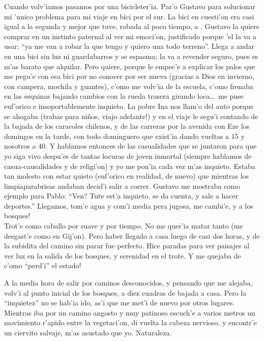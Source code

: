Cuando volv'iamos pasamos por una bicicleter'ia. Par'o Gustavo para solucionar
mi 'unico problema para mi viaje en bici por el sur. La bici en cuesti'on era
casi igual a la segunda y mejor que tuve, robada al poco tiempo, a
. Gustavo la quiere comprar en un instinto paternal al ver mi
emoci'on, justificado porque 'el la va a usar: ``ya me van a robar la que tengo
y quiero una todo terreno''. Llega a andar en una bici sin luz ni guardabarros y
se espasma; la va a revender seguro, pues es m'as barato que alquilar. Pero
quiere, porque le empec'e a explicar los palos que me pegu'e con esa bici por no
conocer por ser nueva (gracias a Dios en invierno, con campera, mochila y
guantes), c'omo me volv'ia de la escuela, c'omo frenaba en las esquinas bajando
cambios con la rueda trasera girando loca\ldots\ me puse euf'orico e
insoportablemente inquieto. La pobre Ina nos llam'o del auto porque se ahogaba
(trabas para ni\~nos, \textexclamdown viajo adelante!) y en el viaje le segu'i
contando de la bajada de los caracoles chilenos, y de las carreras por la
avenida con Eze los domingos en la tarde, con todo dominguero que exist'ia dando
vueltas a 15 y nosotros a 40. Y hablamos entonces de las casualidades que se
juntaron para que yo siga vivo despu'es de tantas locuras de joven inmortal
(siempre hablamos de casua-causalidades y de religi'on) y yo me pon'ia cada vez
m'as inquieto. Estaba tan molesto con estar quieto (euf'orico en realidad, de
nuevo) que mientras los limpiaparabrisas andaban decid'i salir a correr. Gustavo
me mostraba como ejemplo para Pablo: ``\textquestiondown Ven? Tute est'a
inquieto, se da cuenta, y sale a hacer deportes.'' Llegamos, tom'e agua y com'i
media pera jugosa, me cambi'e, \textexclamdown y a los bosques!\\

Trot'e como caballo por suave y por tiempo. No me quer'ia matar tanto (me
desgast'e como en Gij'on). Pero haber llegado a casa luego de casi dos horas, y
de la subidita del camino sin parar fue perfecto. Hice paradas para ver paisajes
al ver luz en la salida de los bosques, y serenidad en el trote. \textexclamdown
Y me quejaba de c'omo ``perd'i'' el estado!

A la media hora de salir por caminos desconocidos, y pensando que me alejaba,
volv'i al punto inicial de los bosques, a diez cuadras de bajada a casa. Pero la
``inquietez'' no se hab'ia ido, as'i que me met'i de nuevo por otros lugares.
Mientras iba por un camino angosto y muy patinoso escuch'e a varios metros un
movimiento r'apido entre la vegetaci'on, di vuelta la cabeza nervioso, y
encontr'e un ciervito salvaje, m'as asustado que yo. Naturaleza.

